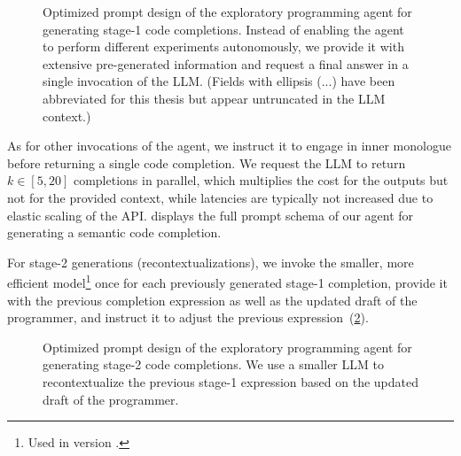 \begin{figure}
	\centering
	\begin{threeparttable}
		\centering
		{\footnotesize
		}
	\end{threeparttable}
	\caption[Optimized prompt design of the exploratory programming agent for generating stage-1 code completions.]{
		Optimized prompt design of the exploratory programming agent for generating stage-1 code completions.
		Instead of enabling the agent to perform different experiments autonomously, we provide it with extensive pre-generated information and request a final answer in a single invocation of the LLM.
		(Fields with ellipsis (...) have been abbreviated for this thesis but appear untruncated in the LLM context.)
	}
	\label{fig:agent/completions/prompt_design_1}
\end{figure}

As for other invocations of the agent, we instruct it to engage in inner monologue before returning a single code completion.
We request the LLM to return $k \in [5, 20]$ completions in parallel, which multiplies the cost for the outputs but not for the provided context, while latencies are typically not increased due to elastic scaling of the API.
 displays the full prompt schema of our agent for generating a semantic code completion.

For stage-2 generations (recontextualizations), we invoke the smaller, more efficient \gptfouromini model\footnote{Used in version .} once for each previously generated stage-1 completion, provide it with the previous completion expression as well as the updated draft of the programmer, and instruct it to adjust the previous expression~(\cref{fig:agent/completions/prompt_design_2}).

\begin{figure}
	\centering
	\begin{threeparttable}
		\centering
		{\footnotesize
		\thimport{03_completions/prompt_design_2}}
	\end{threeparttable}
	\caption[Optimized prompt design of the exploratory programming agent for generating stage-2 code completions.]{
		Optimized prompt design of the exploratory programming agent for generating stage-2 code completions.
		We use a smaller LLM to recontextualize the previous stage-1 expression based on the updated draft of the programmer.
	}
	\label{fig:agent/completions/prompt_design_2}
\end{figure}
